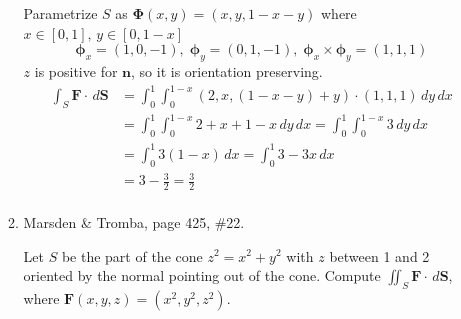 \documentclass{article}
\begin{document}
\begin{enumerate}
\begin{enumerate}
                Parametrize $S$ as $\boldsymbol \Phi (x,y) = (x,y, 1-x-y)$ where $x \in [0,1],\, y \in [0, 1-x]$
                \[ \boldsymbol \phi_x = (1,0,-1) , \; \boldsymbol \phi_y = (0,1,-1),\; \boldsymbol \phi_x \times \boldsymbol \phi_y = (1,1,1)\]
                $z$ is positive for $\boldsymbol n$, so it is orientation preserving.
                \begin{align*}
                    \int_S \boldsymbol F \cdot \, d \boldsymbol S &= \int_0^1 \int_0^{1-x} (2,x, (1-x-y)+y) \cdot (1,1,1) \, dy \, dx \\
                    &= \int_0^1 \int_0^{1-x} 2+x+ 1-x \, dy \, dx = \int_0^1 \int_0^{1-x} 3 \, dy \, dx  \\
                    &= \int_0^1 3(1-x)\, dx = \int_0^1 3 - 3x \, dx  \\
                    &= 3 - \frac{3}{2} = \frac{3}{2} \\
                \end{align*}
                 \item Marsden \& Tromba, page 425, \#22.

                    Let $S$ be the part of the cone $z^2 = x^2 + y^2$ with $z$ between 1 and 2 oriented by the normal pointing out of the cone. Compute $\iint_S \boldsymbol F \cdot \, d \boldsymbol S$, where $\boldsymbol F (x,y,z) = (x^2, y^2, z^2)$.
                    

\end{enumerate}
\end{enumerate}
\end{document}
